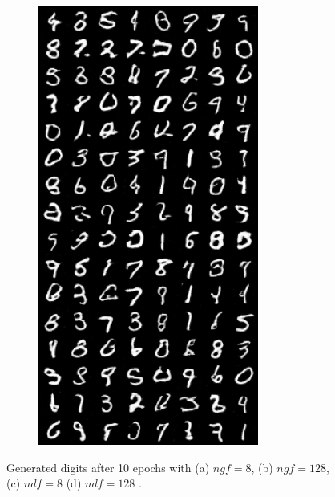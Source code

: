\begin{figure}[H]
\begin{subfigure}{0.2\textwidth}
        \includegraphics[width=0.95\linewidth]{ndf/128/fake_sample_epoch_0010.png}
        \caption{}
        \label{subfig:ndf/128/fake_sample_epoch_0010}
    \end{subfigure}%

    \caption{Generated digits after 10 epochs with (a) $ngf = 8$, (b) $ ngf = 128 $, (c) $ ndf = 8 $ (d) $ndf=128$ .}
    \label{fig:ndf_ngf_images}
\end{figure}

